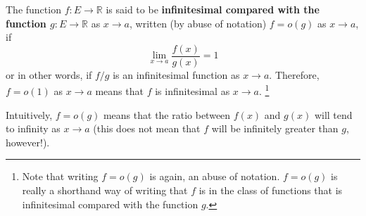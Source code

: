     \begin{definition}
      The function $f: E \longrightarrow \mathbb{R}$ is said to be \textbf{infinitesimal compared with the function $g: E \longrightarrow \mathbb{R}$} as $x \rightarrow a$, written (by abuse of notation) $f = o(g)$ as $x \rightarrow a$, if 
      \[\lim_{x \rightarrow a} \frac{f(x)}{g(x)} = 1\]
      or in other words, if $f/g$ is an infinitesimal function as $x \rightarrow a$. Therefore, $f = o(1)$ as $x \rightarrow a$ means that $f$ is infinitesimal as $x \rightarrow a$. \footnote{Note that writing $f = o(g)$ is again, an abuse of notation. $f = o(g)$ is really a shorthand way of writing that $f$ is in the class of functions that is infinitesimal compared with the function $g$.}
    \end{definition}

    Intuitively, $f = o(g)$ means that the ratio between $f(x)$ and $g(x)$ will tend to infinity as $x \rightarrow a$ (this does not mean that $f$ will be infinitely greater than $g$, however!). 

